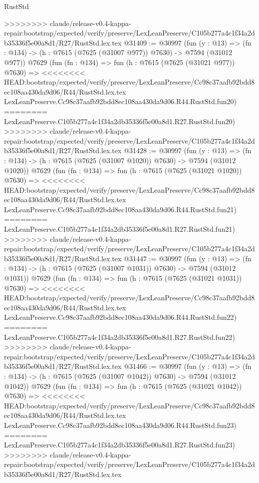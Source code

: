 \begin{lexlean}{RustStd}
\begin{coremodule}
{\begin{coremodule}
{{{{{{{{{{{{{{{{{{{{{{{{{{{{{{{{{{>>>>>>>> claude/release-v0.4-kappa-repair:bootstrap/expected/verify/preserve/LexLeanPreserve/C105b277a4c1f34a2db35336f5e00a8d1/R27/RustStd.lex.tex
@31409 := @30997
    (fun (y : @13) => (fn : @134) -> (h : @7615 (@7625 (@31007 @977)) @7630) -> @7594 (@31012 @977))
    @7629
    (fun (fn : @134) =>
    fun (h : @7615 (@7625 (@31021 @977)) @7630) =>
<<<<<<<< HEAD:bootstrap/expected/verify/preserve/LexLeanPreserve/Cc98c37aafb92bdd8ec108aa430da9d06/R44/RustStd.lex.tex
    LexLeanPreserve.Cc98c37aafb92bdd8ec108aa430da9d06.R44.RustStd.fun20)
========
    LexLeanPreserve.C105b277a4c1f34a2db35336f5e00a8d1.R27.RustStd.fun20)
>>>>>>>> claude/release-v0.4-kappa-repair:bootstrap/expected/verify/preserve/LexLeanPreserve/C105b277a4c1f34a2db35336f5e00a8d1/R27/RustStd.lex.tex
@31428 := @30997
    (fun (y : @13) =>
    (fn : @134) -> (h : @7615 (@7625 (@31007 @1020)) @7630) -> @7594 (@31012 @1020))
    @7629
    (fun (fn : @134) =>
    fun (h : @7615 (@7625 (@31021 @1020)) @7630) =>
<<<<<<<< HEAD:bootstrap/expected/verify/preserve/LexLeanPreserve/Cc98c37aafb92bdd8ec108aa430da9d06/R44/RustStd.lex.tex
    LexLeanPreserve.Cc98c37aafb92bdd8ec108aa430da9d06.R44.RustStd.fun21)
========
    LexLeanPreserve.C105b277a4c1f34a2db35336f5e00a8d1.R27.RustStd.fun21)
>>>>>>>> claude/release-v0.4-kappa-repair:bootstrap/expected/verify/preserve/LexLeanPreserve/C105b277a4c1f34a2db35336f5e00a8d1/R27/RustStd.lex.tex
@31447 := @30997
    (fun (y : @13) =>
    (fn : @134) -> (h : @7615 (@7625 (@31007 @1031)) @7630) -> @7594 (@31012 @1031))
    @7629
    (fun (fn : @134) =>
    fun (h : @7615 (@7625 (@31021 @1031)) @7630) =>
<<<<<<<< HEAD:bootstrap/expected/verify/preserve/LexLeanPreserve/Cc98c37aafb92bdd8ec108aa430da9d06/R44/RustStd.lex.tex
    LexLeanPreserve.Cc98c37aafb92bdd8ec108aa430da9d06.R44.RustStd.fun22)
========
    LexLeanPreserve.C105b277a4c1f34a2db35336f5e00a8d1.R27.RustStd.fun22)
>>>>>>>> claude/release-v0.4-kappa-repair:bootstrap/expected/verify/preserve/LexLeanPreserve/C105b277a4c1f34a2db35336f5e00a8d1/R27/RustStd.lex.tex
@31466 := @30997
    (fun (y : @13) =>
    (fn : @134) -> (h : @7615 (@7625 (@31007 @1042)) @7630) -> @7594 (@31012 @1042))
    @7629
    (fun (fn : @134) =>
    fun (h : @7615 (@7625 (@31021 @1042)) @7630) =>
<<<<<<<< HEAD:bootstrap/expected/verify/preserve/LexLeanPreserve/Cc98c37aafb92bdd8ec108aa430da9d06/R44/RustStd.lex.tex
    LexLeanPreserve.Cc98c37aafb92bdd8ec108aa430da9d06.R44.RustStd.fun23)
========
    LexLeanPreserve.C105b277a4c1f34a2db35336f5e00a8d1.R27.RustStd.fun23)
>>>>>>>> claude/release-v0.4-kappa-repair:bootstrap/expected/verify/preserve/LexLeanPreserve/C105b277a4c1f34a2db35336f5e00a8d1/R27/RustStd.lex.tex
}}}}}}}}}}}}}}}}}}}}}}}}}}}}}}}}}}
\end{coremodule}}
\end{coremodule}
\end{lexlean}
